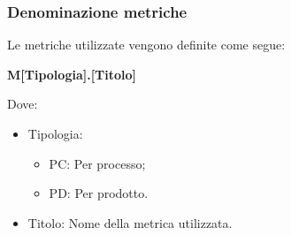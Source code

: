 \subsubsection{Denominazione metriche}

Le metriche utilizzate vengono definite come segue:

\begin{center}
    \large{\textbf{M[Tipologia].[Titolo]}}
\end{center}

Dove:
    \begin{itemize}
        \item Tipologia: \begin{itemize};
            \item PC: Per processo;
            \item PD: Per prodotto.
        \end{itemize}
        \item Titolo: Nome della metrica utilizzata.
    \end{itemize}

